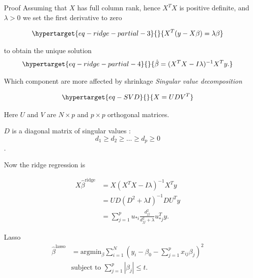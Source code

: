 \documentclass[
  ignorenonframetext,
  aspectratio=32,
]{beamer}
\begin{document}
\begin{frame}{Proof}
\protect\hypertarget{proof}{}
Assuming that \(X\) has full column rank, hence \(X^T X\) is positive
definite, and \(\lambda > 0\) we set the first derivative to zero

\begin{equation}\protect\hypertarget{eq-ridge-partial-3}{}{
X^T (y - X \beta ) = \lambda \beta
}\label{eq-ridge-partial-3}\end{equation}

to obtain the unique solution
\begin{equation}\protect\hypertarget{eq-ridge-partial-4}{}{
\hat \beta
= 
(X^T X - I \lambda)^{-1} X^T y.
}\label{eq-ridge-partial-4}\end{equation}
\end{frame}

\begin{frame}{Which component are more affected by shrinkage}
\protect\hypertarget{which-component-are-more-affected-by-shrinkage}{}
\emph{Singular value decomposition}

\begin{equation}\protect\hypertarget{eq-SVD}{}{
X = U D V^T
}\label{eq-SVD}\end{equation}

Here \(U\) and \(V\) are \(N \times p\) and \(p \times p\) orthogonal
matrices.

\(D\) is a diagonal matrix of singular values : \[
d_1 \geq d_2 \geq \ldots \geq d_p \geq 0
\].

Now the ridge regression is

\begin{align}
X \hat{\beta}^{\text{ridge}}
& =
X(X^T X - I \lambda)^{-1} X^T y
\\
& =  
U D (D^2 + \lambda I)^{-1} D U^T y
\\
& =
\sum_{j = 1}^p 
u_{* i} \frac{d_{j j} ^2}{d_{j j}^2 + \lambda } u_{* j}^T y. 
\end{align}
\end{frame}

\begin{frame}{Lasso}
\protect\hypertarget{lasso}{}
\begin{align}
\hat{\beta}^{\text{lasso}}
& = 
\text{argmin}_\beta
    \sum_{i = 1}^N
    \left(
        y_i - \beta_0 
        - \sum_{j = 1}^p
        x_{i j} \beta_j
    \right)^2
\\
\nonumber
&
\text{subject to }
\sum_{j = 1}^p |\beta_j| \leq t.
\end{align}
\end{frame}
\end{document}
